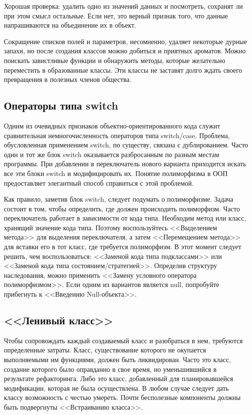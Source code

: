 \documentclass{../../text-style}
\begin{document}
Хорошая проверка: удалить одно из значений данных и посмотреть, сохранят ли при этом смысл остальные. Если нет, это верный признак того, что данные напрашиваются на объединение их в объект.

Сокращение списков полей и параметров, несомненно, удаляет некоторые дурные запахи, но после создания классов можно добиться и приятных ароматов. Можно поискать завистливые функции и обнаружить методы, которые желательно переместить в образованные классы. Эти классы не заставят долго ждать своего превращения в полезных членов общества.

\subsection{Операторы типа switch}

Одним из очевидных признаков объектно-ориентированного кода служит сравнительная немногочисленность операторов типа switch/case. Проблема, обусловленная применением switch, по существу, связана с дублированием. Часто один и тот же блок switch оказывается разбросанным по разным местам программы. При добавлении в переключатель нового варианта приходится искать все эти блоки switch и модифицировать их. Понятие полиморфизма в ООП предоставляет элегантный способ справиться с этой проблемой.

Как правило, заметив блок switch, следует подумать о полиморфизме. Задача состоит в том, чтобы определить, где должен происходить полиморфизм. Часто переключатель работает в зависимости от кода типа. Необходим метод или класс, хранящий значение кода типа. Поэтому воспользуйтесь <<Выделением метода>> для выделения переключателя, а затем <<Перемещением метода>> для вставки его в тот класс, где требуется полиморфизм. В этот момент следует решить, чем воспользоваться: <<Заменой кода типа подклассами>> или <<Заменой кода типа состоянием/стратегией>>. Определив структуру наследования, можно применить <<Замену условного оператора полиморфизмом>>. Если одним из вариантов является null, попробуйте прибегнуть к <<Введению Null-объекта>>.

\subsection{<<Ленивый класс>>}

Чтобы сопровождать каждый создаваемый класс и разобраться в нем, требуются определенные затраты. Класс, существование которого не окупается выполняемыми им функциями, должен быть ликвидирован. Часто это класс, создание которого было оправданно в свое время, но уменьшившийся в результате рефакторинга. Либо это класс, добавленный для планировавшейся модификации, которая не была осуществлена. В любом случае следует дать классу возможность с честью умереть. Почти бесполезные компоненты должны быть подвергнуты <<Встраиванию класса>>.
\end{document}
